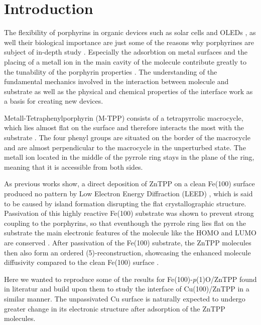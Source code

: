 \chapter{Introduction}
The flexibility of porphyrins in organic devices such as solar cells \cite*{schmidt-mende_zn-porphyrin-sensitized_2005} and OLEDs \cite*{graham_extended_2011}, as well their biological importance \cite*{dolphin_biochemical_1974} are just some of the reasons why porphyrines are subject of in-depth study \cite*{gottfried_surface_2015}.
Especially the adsorbtion on metal surfaces and the placing of a metall ion in the main cavity of the molecule contribute greatly to the tunability of the porphyrin properties \cite*{calloni_electron_2014}.
The understanding of the fundamental mechanics involved in the interaction between molecule and substrate as well as the physical and chemical properties of the interface work as a basis for creating new devices.

Metall-Tetraphenylporphyrin (M-TPP) consists of a tetrapyrrolic macrocycle, which lies almost flat on the surface and therefore interacts the most with the substrate \cite*{picone_local_2018}.
The four phenyl groups are situated on the border of the macrocycle and are almost perpendicular to the macrocycle in the unperturbed state.
The metall ion located in the middle of the pyrrole ring stays in the plane of the ring, meaning that it is accessible from both sides.

As previous works show, a direct deposition of ZnTPP on a clean Fe(100) surface produced no pattern by Low Electron Energy Diffraction (LEED) \cite*{bussetti_structure_2016}, which is said to be caused by island formation disrupting the flat crystallographic structure.
Passivation of this highly reactive Fe(100) substrate was shown to prevent strong coupling to the porphyrins, so that eventhough the pyrrole ring lies flat on the substrate the main electronic features of the molecule like the HOMO and LUMO are conserved \cite*{picone_local_2018}.
After passivation of the Fe(100) substrate, the ZnTPP molecules then also form an ordered (5)-reconstruction, showcasing the enhanced molecule diffusivity compared to the clean Fe(100) surface \cite*{bussetti_structure_2016}.

Here we wanted to reproduce some of the results for Fe(100)-\textit{p}(1)O/ZnTPP found in literatur \cite*{bussetti_filled_2016} and build upon them to study the interface of Cu(100)/ZnTPP in a similar manner.
The unpassivated Cu surface is naturally expected to undergo greater change in its electronic structure after adsorption of the ZnTPP molecules.
